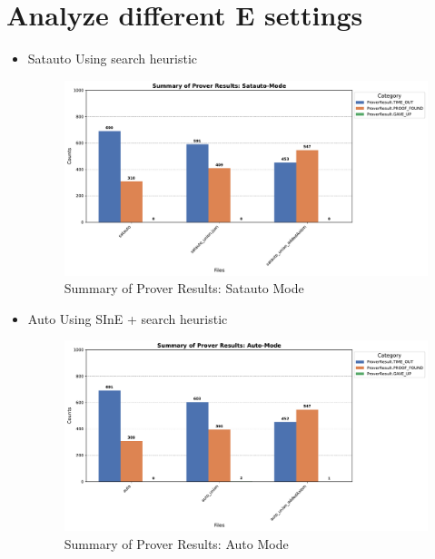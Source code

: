 \documentclass[english,version-2020-11]{uzl-thesis}
\begin{document}
    \section{Analyze different E settings}
      \begin{itemize}
        \item Satauto
          Using search heuristic
          \begin{figure}[h!]
            \centering
            \includegraphics[width=\textwidth]{satauto_mode_output.pdf} %
            \caption{Summary of Prover Results: Satauto Mode}
            \label{fig:prover_results_satauto}
          \end{figure}
        \item Auto
          Using SInE + search heuristic
          \begin{figure}[h!]
            \centering
            \includegraphics[width=\textwidth]{auto_mode_output.pdf} %
            \caption{Summary of Prover Results: Auto Mode}
            \label{fig:prover_results_auto}
          \end{figure}
          \clearpage
      \end{itemize}
\end{document}
